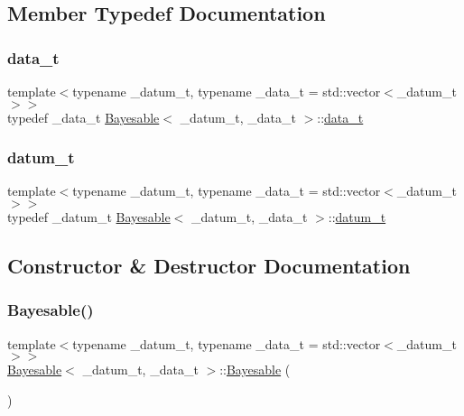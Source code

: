 \subsection{Member Typedef Documentation}
\mbox{\label{class_bayesable_aa2788c4d7718c0a824e1d28c4c98f921}} 
\subsubsection{\texorpdfstring{data\+\_\+t}{data\_t}}
{\footnotesize\ttfamily template$<$typename \+\_\+datum\+\_\+t, typename \+\_\+data\+\_\+t = std\+::vector$<$\+\_\+datum\+\_\+t$>$$>$ \\
typedef \+\_\+data\+\_\+t \hyperlink{class_bayesable}{Bayesable}$<$ \+\_\+datum\+\_\+t, \+\_\+data\+\_\+t $>$\+::\hyperlink{class_bayesable_aa2788c4d7718c0a824e1d28c4c98f921}{data\+\_\+t}}

\mbox{\label{class_bayesable_a9f1a6c0cd7855550fa10b1a8f13a5867}} 
\subsubsection{\texorpdfstring{datum\+\_\+t}{datum\_t}}
{\footnotesize\ttfamily template$<$typename \+\_\+datum\+\_\+t, typename \+\_\+data\+\_\+t = std\+::vector$<$\+\_\+datum\+\_\+t$>$$>$ \\
typedef \+\_\+datum\+\_\+t \hyperlink{class_bayesable}{Bayesable}$<$ \+\_\+datum\+\_\+t, \+\_\+data\+\_\+t $>$\+::\hyperlink{class_bayesable_a9f1a6c0cd7855550fa10b1a8f13a5867}{datum\+\_\+t}}



\subsection{Constructor \& Destructor Documentation}
\mbox{\label{class_bayesable_aec41e7016c9c1eb6978e1360c23f20cd}} 
\subsubsection{\texorpdfstring{Bayesable()}{Bayesable()}}
{\footnotesize\ttfamily template$<$typename \+\_\+datum\+\_\+t, typename \+\_\+data\+\_\+t = std\+::vector$<$\+\_\+datum\+\_\+t$>$$>$ \\
\hyperlink{class_bayesable}{Bayesable}$<$ \+\_\+datum\+\_\+t, \+\_\+data\+\_\+t $>$\+::\hyperlink{class_bayesable}{Bayesable} (\begin{DoxyParamCaption}{ }\end{DoxyParamCaption})\hspace{0.3cm}{\ttfamily [inline]}}



